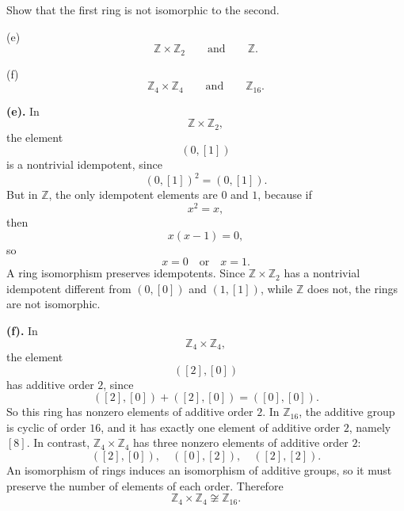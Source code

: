 \begin{problem}{
    Show that the first ring is not isomorphic to the second.

    (e)
    \[
        \mathbb{Z}\times\mathbb{Z}_2
        \qquad\text{and}\qquad
        \mathbb{Z}.
    \]

    (f)
    \[
        \mathbb{Z}_4\times\mathbb{Z}_4
        \qquad\text{and}\qquad
        \mathbb{Z}_{16}.
    \]
}
    \textbf{(e).}
    In
    \[
        \mathbb{Z}\times\mathbb{Z}_2,
    \]
    the element
    \[
        (0,[1])
    \]
    is a nontrivial idempotent, since
    \[
        (0,[1])^2=(0,[1]).
    \]
    But in $\mathbb{Z}$, the only idempotent elements are $0$ and $1$, because if
    \[
        x^2=x,
    \]
    then
    \[
        x(x-1)=0,
    \]
    so
    \[
        x=0
        \quad\text{or}\quad
        x=1.
    \]
    A ring isomorphism preserves idempotents.
    Since $\mathbb{Z}\times\mathbb{Z}_2$ has a nontrivial idempotent different from $(0,[0])$ and $(1,[1])$, while $\mathbb{Z}$ does not, the rings are not isomorphic.

    \textbf{(f).}
    In
    \[
        \mathbb{Z}_4\times\mathbb{Z}_4,
    \]
    the element
    \[
        ([2],[0])
    \]
    has additive order $2$, since
    \[
        ([2],[0])+([2],[0])=([0],[0]).
    \]
    So this ring has nonzero elements of additive order $2$.
    In $\mathbb{Z}_{16}$, the additive group is cyclic of order $16$, and it has exactly one element of additive order $2$, namely $[8]$.
    In contrast, $\mathbb{Z}_4\times\mathbb{Z}_4$ has three nonzero elements of additive order $2$:
    \[
        ([2],[0]),\quad ([0],[2]),\quad ([2],[2]).
    \]
    An isomorphism of rings induces an isomorphism of additive groups, so it must preserve the number of elements of each order.
    Therefore
    \[
        \mathbb{Z}_4\times\mathbb{Z}_4
        \not\cong
        \mathbb{Z}_{16}.
    \]
\end{problem}

